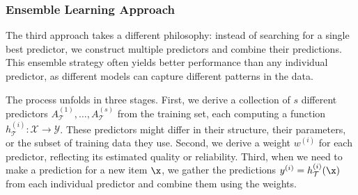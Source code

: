 \subsubsection*{Ensemble Learning Approach}

The third approach takes a different philosophy: instead of searching for a single best predictor, we construct multiple predictors and combine their predictions. This \alert{ensemble} strategy often yields better performance than any individual predictor, as different models can capture different patterns in the data.

The process unfolds in three stages. First, we derive a collection of $s$ different predictors $A^{(1)}_{\mathcal{T}}, \ldots, A^{(s)}_{\mathcal{T}}$ from the training set, each computing a function $h^{(i)}_{\mathcal{T}}: \mathcal{X} \rightarrow \mathcal{Y}$. These predictors might differ in their structure, their parameters, or the subset of training data they use. Second, we derive a weight $w^{(i)}$ for each predictor, reflecting its estimated quality or reliability. Third, when we need to make a prediction for a new item $\x$, we gather the predictions $y^{(i)} = h^{(i)}_{\mathcal{T}}(\x)$ from each individual predictor and combine them using the weights.

